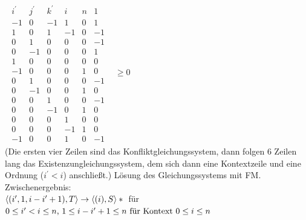 \begin{enumerate}
$
\begin{array}{cc}
\begin{array}{cccccc}
i^\prime & j^\prime & k^\prime & i & n & 1  \\
-1       & 0        & -1       & 1 & 0 & 1  \\
1        & 0        & 1        & -1& 0 & -1 \\
0        & 1        & 0        & 0 & 0 & -1 \\
0        & -1       & 0        & 0 & 0 & 1  \\
1        & 0        & 0        & 0 & 0 & 0  \\
-1       & 0        & 0        & 0 & 1 & 0  \\
0        & 1        & 0        & 0 & 0 & -1 \\
0        & -1       & 0        & 0 & 1 & 0  \\
0        & 0        & 1        & 0 & 0 & -1 \\
0        & 0        & -1       & 0 & 1 & 0  \\
0        & 0        & 0        & 1 & 0 & 0  \\
0        & 0        & 0        &-1 & 1 & 0  \\
-1       & 0        & 0        & 1 & 0 &-1
\end{array}
& \geq 0
\end{array}$\\

(Die ersten vier Zeilen sind das Konfliktgleichungssystem, dann folgen 6 Zeilen lang das Existenzungleichungssystem, dem sich dann eine Kontextzeile und eine Ordnung (\( i^\prime < i \)) anschließt.)
Lösung des Gleichungssystems mit FM.\\

Zwischenergebnis: \\$\langle (i^\prime, 1, i-i^\prime+1), T \rangle \rightarrow \langle (i), S \rangle *\\$ für $ 0 \leq i^\prime < i \leq n \text{, } 1\leq i-i^\prime + 1 \leq n \\
\text{ für Kontext } 0\leq i \leq n$


\end{enumerate}
